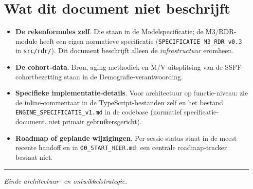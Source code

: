 \documentclass[11pt,a4paper]{article}
\newcommand{\code}[1]{\texttt{#1}}
\begin{document}
\section{Wat dit document niet beschrijft}

\begin{itemize}
\item \textbf{De rekenformules zelf}. Die staan in de Modelspecificatie; de M3/RDR-module heeft een eigen normatieve specificatie (\code{SPECIFICATIE\_M3\_RDR\_v0.3} in \code{src/rdr/}). Dit document beschrijft alleen de \emph{infrastructuur} eromheen.
\item \textbf{De cohort-data}. Bron, aging-methodiek en M/V-uitsplitsing van de SSPF-cohortbezetting staan in de Demografie-verantwoording.
\item \textbf{Specifieke implementatie-details}. Voor architectuur op functie-niveau: zie de inline-commentaar in de TypeScript-bestanden zelf en het bestand \code{ENGINE\_SPECIFICATIE\_v1.md} in de codebase (normatief specificatie-document, niet primair gebruikersgericht).
\item \textbf{Roadmap of geplande wijzigingen}. Per-sessie-status staat in de meest recente handoff en in \code{00\_START\_HIER.md}; een centrale roadmap-tracker bestaat niet.
\end{itemize}

\vspace{2em}
\hrule
\vspace{0.5em}
\emph{Einde architectuur- en ontwikkelstrategie.}
\end{document}
